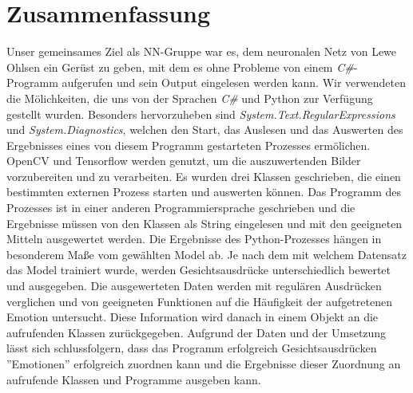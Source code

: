 \documentclass[10pt,a4paper]{report}
\begin{document}
\section{Zusammenfassung}
Unser gemeinsames Ziel als NN-Gruppe war es, dem neuronalen Netz von Lewe Ohlsen ein Ger\"{u}st zu geben, mit dem es ohne Probleme von einem \textit{C\#}-Programm aufgerufen und sein Output eingelesen werden kann.%
Wir verwendeten die M\"{o}lichkeiten, die uns von der Sprachen \textit{C\#} und Python zur Verf\"{u}gung gestellt wurden. Besonders hervorzuheben sind \textit{System.Text.RegularExpressions} und \textit{System.Diagnostics}, welchen den Start, das Auslesen und das Auswerten des Ergebnisses eines von diesem Programm gestarteten Prozesses erm\"{o}lichen. OpenCV und Tensorflow werden genutzt, um die auszuwertenden Bilder vorzubereiten und zu verarbeiten.%
Es wurden drei Klassen geschrieben, die einen bestimmten externen Prozess starten und auswerten k\"{o}nnen. Das Programm des Prozesses ist in einer anderen Programmiersprache geschrieben und die Ergebnisse m\"{u}ssen von den Klassen als String eingelesen und mit den geeigneten Mitteln ausgewertet werden. Die Ergebnisse des Python-Prozesses h\"{a}ngen in besonderem Ma{\ss}e vom gew\"{a}hlten Model ab. Je nach dem mit welchem Datensatz das Model trainiert wurde, werden Gesichtsausdr\"{u}cke unterschiedlich bewertet und ausgegeben. %
Die ausgewerteten Daten werden mit regul\"{a}ren Ausdr\"{u}cken verglichen und von geeigneten Funktionen auf die H\"{a}ufigkeit der aufgetretenen Emotion untersucht. Diese Information wird danach in einem Objekt an die aufrufenden Klassen zur\"{u}ckgegeben.%
\newline
Aufgrund der Daten und der Umsetzung l\"{a}sst sich schlussfolgern, dass das Programm erfolgreich Gesichtsausdr\"{u}cken ''Emotionen'' erfolgreich zuordnen kann und die Ergebnisse dieser Zuordnung an aufrufende Klassen und Programme ausgeben kann.%
 



%
\end{document}
